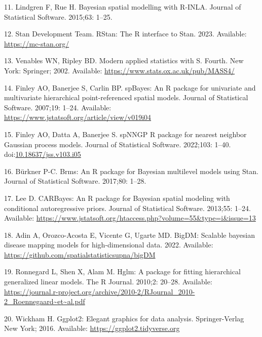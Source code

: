 \documentclass[10pt,letterpaper]{article}
\begin{document}
\leavevmode\hypertarget{ref-lindgren2015bayesian}{}%
11. Lindgren F, Rue H. Bayesian spatial modelling with R-INLA. Journal
of Statistical Software. 2015;63: 1--25.

\leavevmode\hypertarget{ref-rstan2023rstan}{}%
12. Stan Development Team. RStan: The R interface to Stan. 2023.
Available: \url{https://mc-stan.org/}

\leavevmode\hypertarget{ref-venables2002S}{}%
13. Venables WN, Ripley BD. Modern applied statistics with S. Fourth.
New York: Springer; 2002. Available:
\url{https://www.stats.ox.ac.uk/pub/MASS4/}

\leavevmode\hypertarget{ref-finley2007spbayes}{}%
14. Finley AO, Banerjee S, Carlin BP. spBayes: An R package for
univariate and multivariate hierarchical point-referenced spatial
models. Journal of Statistical Software. 2007;19: 1--24. Available:
\url{https://www.jstatsoft.org/article/view/v019i04}

\leavevmode\hypertarget{ref-finley2002spnngp}{}%
15. Finley AO, Datta A, Banerjee S. spNNGP R package for nearest
neighbor Gaussian process models. Journal of Statistical Software.
2022;103: 1--40.
doi:\href{https://doi.org/10.18637/jss.v103.i05}{10.18637/jss.v103.i05}

\leavevmode\hypertarget{ref-burkner2017brms}{}%
16. Bürkner P-C. Brms: An R package for Bayesian multilevel models using
Stan. Journal of Statistical Software. 2017;80: 1--28.

\leavevmode\hypertarget{ref-lee2013carbayes}{}%
17. Lee D. CARBayes: An R package for Bayesian spatial modeling with
conditional autoregressive priors. Journal of Statistical Software.
2013;55: 1--24. Available:
\url{https://www.jstatsoft.org/htaccess.php?volume=55\&type=i\&issue=13}

\leavevmode\hypertarget{ref-adin2022bigdm}{}%
18. Adin A, Orozco-Acosta E, Vicente G, Ugarte MD. BigDM: Scalable
bayesian disease mapping models for high-dimensional data. 2022.
Available: \url{https://github.com/spatialstatisticsupna/bigDM}

\leavevmode\hypertarget{ref-ronnegard2010hglm}{}%
19. Ronnegard L, Shen X, Alam M. Hglm: A package for fitting
hierarchical generalized linear models. The R Journal. 2010;2: 20--28.
Available:
\url{https://journal.r-project.org/archive/2010-2/RJournal_2010-2_Roennegaard~et~al.pdf}

\leavevmode\hypertarget{ref-wickham2016ggplot2}{}%
20. Wickham H. Ggplot2: Elegant graphics for data analysis.
Springer-Verlag New York; 2016. Available:
\url{https://ggplot2.tidyverse.org}
\end{document}
